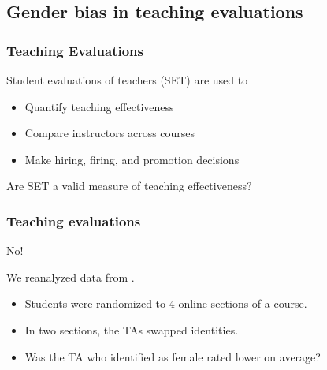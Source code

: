 \documentclass{beamer}
\begin{document}
\subsection[Teaching evaluations]{Gender bias in teaching evaluations}


\frame
{
  \frametitle{Teaching Evaluations}
 \begin{center}
 \Large{ Student evaluations of teachers (SET) are used to} \\
  \begin{itemize}
  \item Quantify teaching effectiveness
  \item Compare instructors across courses
  \item Make hiring, firing, and promotion decisions  
  \end{itemize}
  \vfill
Are SET a valid measure of teaching effectiveness?
\end{center}
}


\frame
{
  \frametitle{Teaching evaluations}
  \begin{center}
  \Huge{No!}
  \end{center}
\Large

We reanalyzed data from \cite{macnell2014whats}.
\begin{center}
\begin{itemize}
\itemsep 15pt
\item Students were randomized to 4 online sections of a course.
\item In two sections, the TAs swapped identities.
\item Was the TA who identified as female rated lower on average?
\end{itemize}
\end{center}
}


\end{document}

